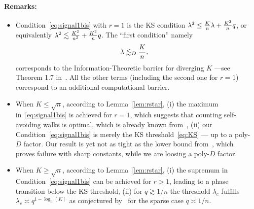 \documentclass[final]{colt2026}
\newcommand{\1}{\mathbf{1}}
\begin{document}
\paragraph{Remarks:} 
\begin{itemize}
\item Condition~\eqref{eq:signal1bis} with $r=1$ is the KS condition $\lambda^2\leq {K\over n}\lambda+{K^2\over n} q$, or equivalently $\lambda^2 \lesssim {K^2\over n^2} + {K^2\over n} q$. The ``first condition''  namely
 $$ \lambda \lesssim_{D} {K\over n},$$
 corresponds to the Information-Theoretic barrier for diverging $K$ ---see Theorem 1.7 in~\cite{pmlr-v291-chin25a}. All the other terms (including the second one for $r=1$) correspond to an additional computational barrier.
\item When $K\leq \sqrt{n}$, according to Lemma~\ref{lem:rstar}, (i) the maximum in~\eqref{eq:signal1bis} is achieved for $r=1$, which suggests that counting self-avoiding walks is optimal, which is already known from~\cite{pmlr-v291-chin25a}, (ii) our 
Condition~\eqref{eq:signal1bis}  is
 merely the KS threshold~\eqref{eq:KS} --- up to a poly-$D$ factor. Our result is yet not as tight as the lower bound from~\cite{pmlr-v291-chin25a}, which proves failure with sharp constants, while we are loosing a poly-$D$ factor.
 \item When $K\geq \sqrt{n}$, according to Lemma~\ref{lem:rstar}, (i) the supremum in  Condition~\eqref{eq:signal1bis} can be achieved for $r>1$, leading to a phase transition below the KS threshold, (ii) for $q\gtrsim 1/n$ the threshold $\lambda_{c}$ fulfills $\lambda_{c} \asymp  q^{1-\log_{n}(K)}$ as conjectured by~\cite{pmlr-v291-chin25a} for the sparse case $q\asymp 1/n$.
\end{itemize}
 
\end{document}
